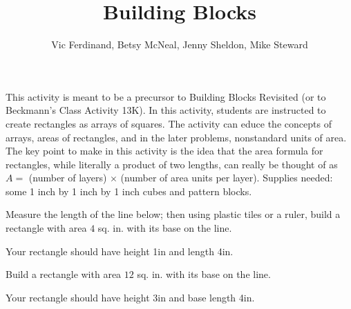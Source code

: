 \documentclass{ximera}
\title{Building Blocks}
\author{Vic Ferdinand, Betsy McNeal, Jenny Sheldon, Mike Steward}
\begin{document}
\begin{abstract}
\end{abstract}

\maketitle

\begin{instructorIntro}
This activity is meant to be a precursor to Building Blocks Revisited (or to Beckmann's Class Activity 13K).  In this activity, students are instructed to create rectangles as arrays of squares.  The activity can educe the concepts of arrays, areas of rectangles, and in the later problems, nonstandard units of area.  The key point to make in this activity is the idea that the area formula for rectangles, while literally a product of two lengths, can really be thought of as $A = $ (number of layers) $\times$ (number of area units per layer).
\vskip 0.1in
Supplies needed: some 1 inch by 1 inch by 1 inch cubes and pattern blocks.




\end{instructorIntro}



\begin{problem} 
Measure the length of the line below; then using plastic tiles or a ruler, build a rectangle with area $4$ sq. in. with its base on the line.

\vspace{1 in}

\begin{solution}
Your rectangle should have height 1in and length 4in.
\end{solution}

\end{problem}

\begin{problem}
Build a rectangle with area $12$ sq. in. with its base on the line.

\vspace{3.25 in}

\begin{solution}
Your rectangle should have height 3in and base length 4in.
\end{solution}

\end{problem}
\end{document}
